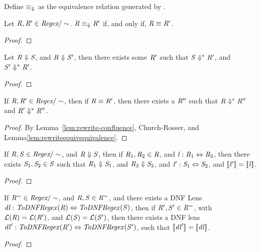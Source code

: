 \begin{definition}[$\equiv_{\Rewrite}$]
Define $\equiv_{\Rewrite}$ as the equivalence relation generated by \Rewrite{}.
\end{definition}

\begin{lemma}[$\equiv_{\Rewrite} = \equiv$ on \EquivRegexType{}]
\label{lem:rewriteequivequivalence}
Let $\mathit{R},\mathit{R}'\in\textit{Regex}/\sim$.
$\mathit{R}\equiv_{\Downarrow}\mathit{R}'$ if, and only if, $\mathit{R}\equiv\mathit{R}'$.
\end{lemma}
\begin{proof}
\end{proof}

\begin{lemma}
\label{lem:rewrite-confluence}
Let $\mathit{R}\Downarrow\mathit{S}$, and $\mathit{R}\Downarrow\mathit{S}'$, then there
exists some $\mathit{R}'$ such that $\mathit{S}\Downarrow^*\mathit{R}'$,
and $\mathit{S}'\Downarrow^*\mathit{R}'$.
\end{lemma}
\begin{proof}
\end{proof}

\begin{lemma}
If $\mathit{R}, \mathit{R}' \in \textit{Regex}/\sim$, then if $\mathit{R}\equiv\mathit{R}'$, then
there exists a $\mathit{R}''$ such that $\mathit{R}\Downarrow^*\mathit{R}''$ and
$\mathit{R}'\Downarrow^*\mathit{R}''$.
\end{lemma}
\begin{proof}
By Lemma~\ref{lem:rewrite-confluence}, Church-Rosser, and
Lemma\ref{lem:rewriteequivequivalence}.
\end{proof}

\begin{lemma}
\label{lem:rewrite-semantic-retention}
If $\mathit{R},\mathit{S}\in\textit{Regex}/\sim$, and
$\mathit{R}\Downarrow\mathit{S}$, then if $\mathit{R}_1,\mathit{R}_2\in\mathit{R}$, and
$\mathit{l} : \mathit{R}_1 \Leftrightarrow \mathit{R}_2$, then there exists
$\mathit{S}_1,\mathit{S}_2\in\mathit{S}$ such that $\mathit{R}_1\Downarrow\mathit{S}_1$,
and $\mathit{R}_2\Downarrow\mathit{S}_2$, and
$\mathit{l}' : \mathit{S}_1 \Leftrightarrow \mathit{S}_2$,
and $[ \! [\mathit{l}'] \! ]=[ \! [\mathit{l}] \! ]$.
\end{lemma}
\begin{proof}
\end{proof}

\begin{lemma}
\label{lem:eqclass-semantic-retention}
If $\mathit{R}^{\sim}\in\textit{Regex}/\sim$, and
$\mathit{R},\mathit{S}\in\mathit{R}^{\sim}$, and there exists a DNF Lens
$\mathit{dl} : \mathit{ToDNFRegex}(\mathit{R}) \Leftrightarrow \mathit{ToDNFRegex}(\mathit{S})$,
then if $\mathit{R}',\mathit{S}'\in\mathit{R}^{\sim}$,
with $\mathcal{L}(\mathit{R})=\mathcal{L}(\mathit{R}')$,
and $\mathcal{L}(\mathit{S})=\mathcal{L}(\mathit{S}')$,
then there exists a DNF lens
$\mathit{dl}' : \mathit{ToDNFRegex}(\mathit{R}') \Leftrightarrow \mathit{ToDNFRegex}(\mathit{S}')$,
such that $[ \! [\mathit{dl}'] \! ]=[ \! [\mathit{dl}] \! ]$.
\end{lemma}
\begin{proof}
\end{proof}

